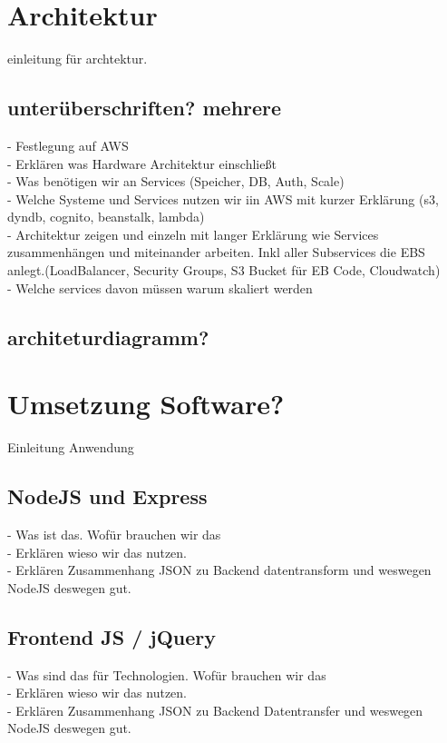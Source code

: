 \documentclass[a4paper, 10pt]{scrreprt}
\begin{document}
\chapter{Architektur}
einleitung für archtektur.

\section{unterüberschriften? mehrere}
- Festlegung auf AWS\\
- Erklären was Hardware Architektur einschließt\\
- Was benötigen wir an Services (Speicher, DB, Auth, Scale)\\
- Welche Systeme und Services nutzen wir iin AWS mit kurzer Erklärung (s3, dyndb, cognito, beanstalk, lambda)\\
- Architektur zeigen und einzeln mit langer Erklärung wie Services zusammenhängen und miteinander arbeiten. Inkl aller Subservices die EBS anlegt.(LoadBalancer, Security Groups, S3 Bucket für EB Code, Cloudwatch)\\
- Welche services davon müssen warum skaliert werden

\section{architeturdiagramm?}

\chapter{Umsetzung Software?}
Einleitung Anwendung

\section{NodeJS und Express}
- Was ist das. Wofür brauchen wir das\\
- Erklären wieso wir das nutzen.\\
- Erklären Zusammenhang JSON zu Backend datentransform und weswegen NodeJS deswegen gut.

\section{Frontend JS / jQuery}
- Was sind das für Technologien. Wofür brauchen wir das\\
- Erklären wieso wir das nutzen. \\
- Erklären Zusammenhang JSON zu Backend Datentransfer und weswegen NodeJS deswegen gut.
\end{document}
